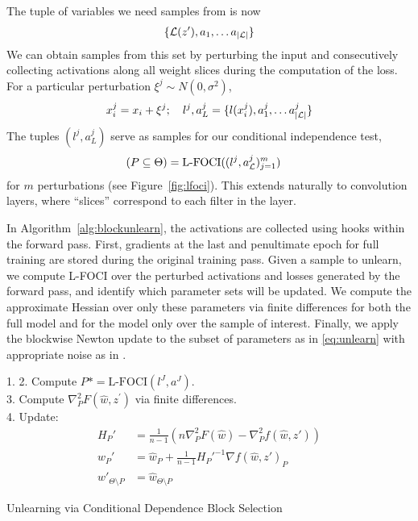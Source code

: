 The tuple of variables we need samples from is now
\begin{align}
    \{\mathcal{L}(z^\prime), a_1, \ldots a_{|\mathcal{L}|}\}
\end{align}
We can obtain samples from this set by perturbing the input and consecutively collecting activations along all weight slices during the computation of the loss. For a particular perturbation $\xi^j \sim N(0,\sigma^2)$,
\begin{align}\label{eq:perturbsupp}
    x_i^j = x_i + \xi^j; \quad
    l^j, a_L^j = \{l(x_i^j), a_1^j, \ldots a_{|\mathcal{L}|}^j\}
\end{align}
The tuples $(l^j, a_L^j)$ serve as samples for our conditional independence test, 
\begin{align}
    (P \subseteq \Theta) &= \mbox{L-FOCI}((l^j, a_{\mathcal{L}}^j)_{j=1}^m)
\end{align}
for $m$ perturbations (see Figure~\ref{fig:lfoci}). This extends naturally to convolution layers, where ``slices'' correspond to each filter in the layer.

In Algorithm~\ref{alg:blockunlearn}, the activations are collected using hooks within the forward pass. 
First, gradients at the last and penultimate epoch for full training are stored during the original training pass. Given a sample to unlearn, we compute L-FOCI over the perturbed activations and losses generated by the forward pass, and identify which parameter sets will be updated. We compute the approximate Hessian over only these parameters via finite differences for both the full model and for the model only over the sample of interest. Finally, we apply the blockwise Newton update to the subset of parameters as in \eqref{eq:unlearn} with appropriate noise as in \cite{sekhari2021remember}.
\begin{algorithm}
\SetAlgoLined
{}
1. 
2. Compute $P* = \mbox{L-FOCI}(l^J, a^J)$. \\
3. Compute $\nabla^2_{P} F(\hat{w}, z^\prime)$ via finite differences. \\
4. Update:
\begin{align}
    H_P' &= \frac{1}{n-1}\left(n \nabla^2_{P} F(\hat{w}) - \nabla^2_{P} f(\hat{w}, z')\right) \\
    w_{P}' &= \hat{w}_{P} + \frac{1}{n-1}H_{P}'^{-1} \nabla f(\hat{w}, z')_{P} \\
    w'_{\Theta\setminus P} &= \hat{w}_{\Theta\setminus P}
\end{align}
 \caption{\label{alg:blockunlearn} Unlearning via Conditional Dependence Block Selection}
\end{algorithm}

